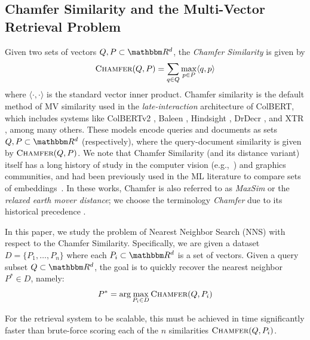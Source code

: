 \documentclass{article}
\newcommand{\CH}{\textsc{Chamfer}}
\begin{document}
\subsection{Chamfer Similarity and the Multi-Vector Retrieval Problem}\label{sec:Chamfer}
Given two sets of vectors $Q,P \subset \R^d$, the \emph{Chamfer Similarity} is given by 
\begin{equation*}
\CH(Q,P) = \sum_{q \in Q} \max_{p \in P} \langle q,p\rangle
\end{equation*}
where $\langle \cdot ,\cdot\rangle$ is the standard vector inner product.  
Chamfer similarity is the default method of MV similarity used in the \textit{late-interaction} architecture of ColBERT, which includes systems like ColBERTv2 \cite{santhanam2021colbertv2},
Baleen \cite{khattab2021baleen}, Hindsight \cite{paranjape2021hindsight}, DrDecr \cite{li2021learning}, and XTR \cite{lee2024rethinking}, among many others. These models encode queries and documents as sets $Q,P \subset \R^d$ (respectively), where the query-document similarity is given by $\CH(Q,P)$. We note that Chamfer Similarity (and its distance variant) itself has a long history of study in the computer vision (e.g.,~\cite{barrow1977parametric,athitsos2003estimating,sudderth2004visual,fan2017point,jiang2018gal}) and graphics~\cite{li2019lbs} communities, and had been previously used in the ML literature to compare sets of embeddings~\cite{kusner2015word,wan2019transductive,atasu19a,bakshi2024near}. In these works, Chamfer is also referred to as \emph{MaxSim} or the \emph{relaxed earth mover distance}; we choose the terminology \textit{Chamfer} due to its historical precedence \cite{barrow1977parametric}.

In this paper, we study the problem of Nearest Neighbor Search (NNS) with respect to the Chamfer Similarity. Specifically, we are given a dataset $D = \{P_1,\dots, P_n\}$ where each $P_i \subset \R^d$ is a set of vectors. Given a query subset $Q \subset \R^d$, the goal is to quickly recover the nearest neighbor $P^* \in D$, namely:
\[P^* = \arg \max_{P_i \in D} \CH(Q,P_i)\] 

For the retrieval system to be scalable, this must be achieved in time significantly faster than brute-force scoring each of the $n$ similarities $\CH(Q,P_i)$.  
\end{document}

